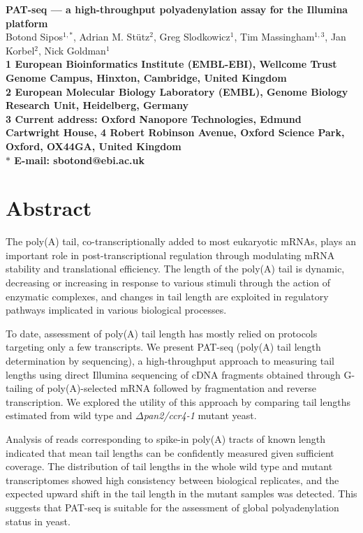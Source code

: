 \documentclass[10pt]{article}
\date{}
\begin{document}
\begin{flushleft}
{\Large
\textbf{PAT-seq --- a high-throughput polyadenylation assay for the Illumina platform}
}
\\
Botond Sipos$^{1, \ast}$, 
Adrian M. St\"utz$^{2}$, 
Greg Slodkowicz$^{1}$,
Tim Massingham$^{1,3}$, 
Jan Korbel$^{2}$, 
Nick Goldman$^{1}$
\\
\bf{1} European Bioinformatics Institute (EMBL-EBI), Wellcome Trust Genome Campus, Hinxton, Cambridge, United Kingdom
\\
\bf{2} European Molecular Biology Laboratory (EMBL), Genome Biology Research Unit, Heidelberg, Germany 
\\
\bf{3} Current address: Oxford Nanopore Technologies, Edmund Cartwright House, 4 Robert Robinson Avenue, Oxford Science Park, Oxford, OX44GA, United Kingdom
\\
$\ast$ E-mail: sbotond@ebi.ac.uk
\end{flushleft}

\section*{Abstract}

The poly(A) tail, co-transcriptionally added to most eukaryotic mRNAs, plays an important role in post-transcriptional regulation through modulating mRNA stability and translational efficiency. The length of the poly(A) tail is dynamic, decreasing or increasing in response to various stimuli through the action of enzymatic complexes, and changes in tail length are exploited in regulatory pathways implicated in various biological processes.

To date, assessment of poly(A) tail length has mostly relied on protocols targeting only a few transcripts. We present PAT-seq (poly(A) tail length determination by sequencing), a high-throughput approach to measuring tail lengths using direct Illumina sequencing of cDNA fragments obtained through G-tailing of poly(A)-selected mRNA followed by fragmentation and reverse transcription. We explored the utility of this approach by comparing tail lengths estimated from wild type and \textit{$\Delta$pan2/ccr4-1} mutant yeast.

Analysis of reads corresponding to spike-in poly(A) tracts of known length indicated that mean tail lengths can be confidently measured given sufficient coverage. The distribution of tail lengths in the whole wild type and mutant transcriptomes showed high consistency between biological replicates, and the expected upward shift in the tail length in the mutant samples was detected. This suggests that PAT-seq is suitable for the assessment of global polyadenylation status in yeast.
\end{document}
